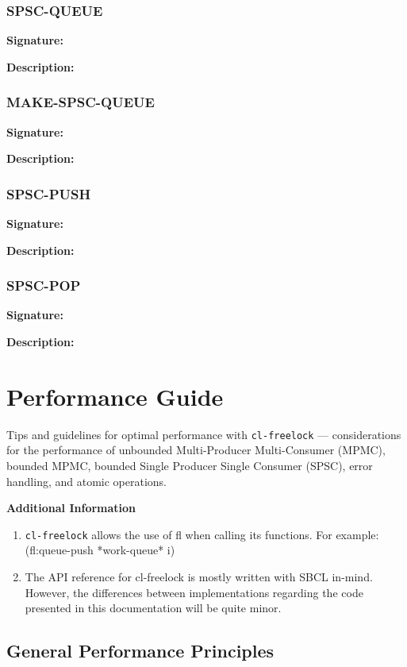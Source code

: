 \documentclass[12pt, letterpaper]{article}
\DeclareRobustCommand{\code}[1]{%
	\begingroup
	\setlength{\fboxsep}{2pt}%
	\colorbox{gray!15}{\ttfamily\small #1}%
	\endgroup
}
\newcommand{\customitem}[2]{%
	\noindent\textbf{#1}\\[0.5ex]%
	#2\vspace{1ex}%
}
\begin{document}
	\subsubsection{SPSC-QUEUE}
	
	\customitem{Signature:}{}
	
	\customitem{Description:}{}
	\subsubsection{MAKE-SPSC-QUEUE}
	
	\customitem{Signature:}{}
	
	\customitem{Description:}{}
	\subsubsection{SPSC-PUSH}
	
	\customitem{Signature:}{}
	
	\customitem{Description:}{}
	\subsubsection{SPSC-POP}
	
	\customitem{Signature:}{}
	
	\customitem{Description:}{}
	
	\section{Performance Guide}
	Tips and guidelines for optimal performance with \texttt{cl-freelock} --- considerations for the performance of unbounded Multi-Producer Multi-Consumer (MPMC), bounded MPMC, bounded Single Producer Single Consumer (SPSC), error handling, and atomic operations.
	
	\textbf{Additional Information}
	\begin{enumerate}
		\item \texttt{cl-freelock} allows the use of \code{fl} when calling its functions.
		\subitem  For example: \code{(fl:queue-push *work-queue* i)}
		\item The API reference for cl-freelock is mostly written with SBCL in-mind. However, the differences between implementations regarding the code presented in this documentation will be quite minor.
	\end{enumerate}
	\subsection{General Performance Principles}
\end{document}
